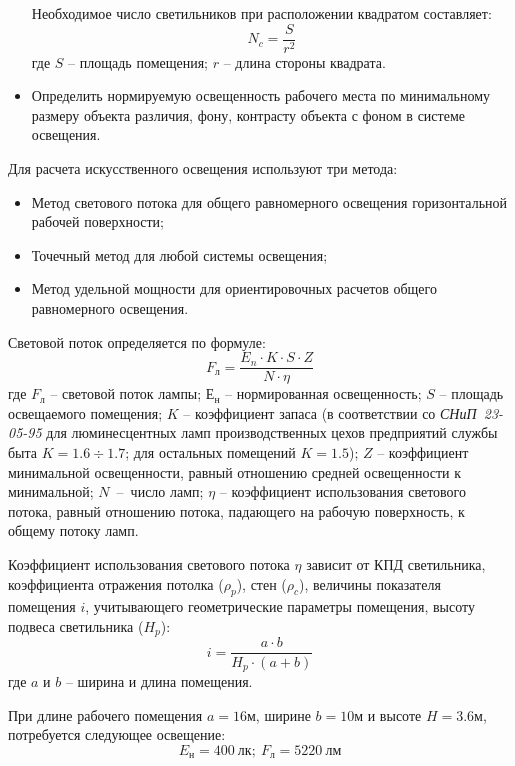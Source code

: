 \begin{itemize}
    Необходимое число светильников при расположении квадратом составляет:
    \begin{equation}\label{eq:lights_count}
        N_c = \frac{S}{r^2}
    \end{equation}
    где $S$ -- площадь помещения; $ r $ -- длина стороны квадрата.

    \item Определить нормируемую освещенность рабочего места по минимальному размеру объекта различия, фону, контрасту объекта
    с фоном в системе освещения.
\end{itemize}

Для расчета искусственного освещения используют три метода:
\begin{itemize}
    \item Метод светового потока для общего равномерного освещения горизонтальной рабочей поверхности;
    \item Точечный метод для любой системы освещения;
    \item Метод удельной мощности для ориентировочных расчетов общего равномерного освещения.
\end{itemize}

Световой поток определяется по формуле:
\begin{equation}\label{eq:light_flux}
F_л = \frac{E_n \cdot K \cdot S \cdot Z}{N \cdot \eta}
\end{equation}
где $F_л$ -- световой поток лампы; $Е_н$ -- нормированная освещенность; $S$ -- площадь освещаемого помещения; $K$ -- коэффициент
запаса (в соответствии со \hbox{\textit{СНиП 23-05-95}} для люминесцентных ламп производственных цехов предприятий службы быта $ K = 1.6 \div 1.7 $; для остальных
        помещений $K = 1.5$); $Z$ -- коэффициент минимальной освещенности, равный отношению средней освещенности к минимальной;
$N$~--~число ламп;
$\eta$ -- коэффициент использования светового потока, равный отношению потока, падающего на рабочую поверхность, к общему
потоку ламп.

Коэффициент использования светового потока $\eta$ зависит от КПД светильника, коэффициента отражения потолка ($ \rho_p $), стен
($\rho_c$),
    величины показателя помещения $i$, учитывающего геометрические параметры помещения, высоту подвеса светильника ($H_p$):
\begin{equation}\label{eq:kpd}
    i = \frac{a \cdot b}{H_p \cdot (a + b)}
\end{equation}
где $ a $ и $ b $ -- ширина и длина помещения.

При длине рабочего помещения $a = 16 м$, ширине $b = 10 м$ и высоте $H = 3.6 м$, потребуется следующее освещение:
$$
    E_н = 400\ лк;\ 
    F_л = 5220\ лм
$$

